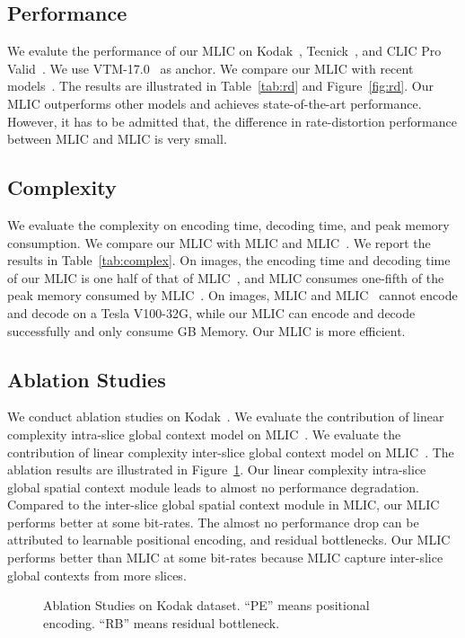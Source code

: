 \documentclass{article}
\theoremstyle{plain}
\theoremstyle{definition}
\theoremstyle{remark}
\begin{document}
  \subsection{Performance}
  \label{sec:exp:perf}
  We evalute the performance of our MLIC on Kodak~\cite{kodak}, Tecnick~\cite{tecnick2014TESTIMAGES}, and CLIC Pro Valid~\cite{CLIC2020}.
  We use VTM-17.0~\cite{vtm2019} as anchor.
  We compare our MLIC with recent models~\cite{jiang2022mlic, koyuncu2022contextformer, he2022elic, zou2022the, zhu2022transformerbased, minnen2020channel, cheng2020learned}.
  The results are illustrated in Table~\ref{tab:rd} and Figure~\ref{fig:rd}.
  Our MLIC outperforms other models and achieves state-of-the-art performance.
  However, it has to be admitted that, the difference in rate-distortion performance between MLIC and MLIC is very small.
  \subsection{Complexity}
  We evaluate the complexity on encoding time, decoding time, and peak memory consumption.
  We compare our MLIC with MLIC and MLIC~\cite{jiang2022mlic}.
  We report the results in Table~\ref{tab:complex}.
  On  images, 
  the encoding time and decoding time of our MLIC is one half of that of MLIC~\cite{jiang2022mlic},
  and MLIC consumes one-fifth of the peak memory consumed by MLIC~\cite{jiang2022mlic}.
  On  images, MLIC and MLIC~\cite{jiang2022mlic}
  cannot encode and decode on a Tesla V100-32G, while our MLIC
  can encode and decode successfully and only consume  GB Memory.
  Our MLIC is more efficient.
  \subsection{Ablation Studies}
  \label{sec:ablation}
  We conduct ablation studies on Kodak~\cite{kodak}.
  We evaluate the contribution of linear complexity intra-slice global context model
  on MLIC~\cite{jiang2022mlic}.
  We evaluate the contribution of linear complexity inter-slice global
  context model on MLIC~\cite{jiang2022mlic}.
  The ablation results are illustrated in Figure~\ref{fig:ablation}.
  Our linear complexity intra-slice global spatial context module 
  leads to almost no performance degradation.
  Compared to the inter-slice global spatial context module in
  MLIC, our MLIC performs better at some bit-rates.
  The almost no performance drop can be attributed to learnable positional encoding, 
  and residual bottlenecks. 
  Our MLIC performs better than MLIC at some bit-rates because MLIC capture 
  inter-slice global contexts from more slices.
  \begin{figure}[t]
      \centering
      \caption{Ablation Studies on Kodak dataset. “PE” means positional encoding.
      “RB” means residual bottleneck.}
      \label{fig:ablation}
    \end{figure}
\end{document}

